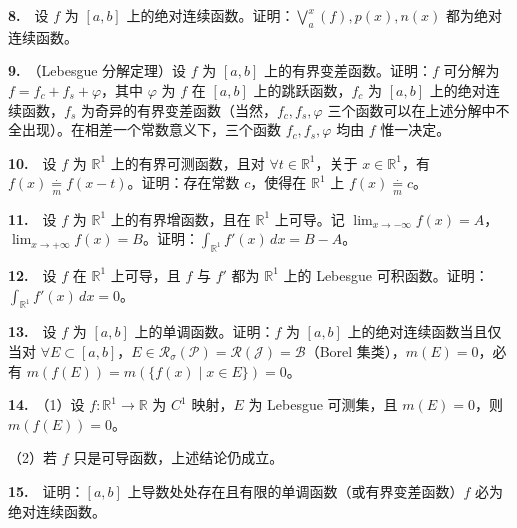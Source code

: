 \documentclass[11pt,a4paper]{article}
\begin{document}
\par{}\noindent \textbf{8.}　设 \(f\) 为 \([a,b]\) 上的绝对连续函数。证明：\(\bigvee_a^x(f),p(x),n(x)\) 都为绝对连续函数。

\par{}\noindent \textbf{9.}　（Lebesgue 分解定理）设 \(f\) 为 \([a,b]\) 上的有界变差函数。证明：\(f\) 可分解为 \(f=f_c+f_s+\varphi\)，其中 \(\varphi\) 为 \(f\) 在 \([a,b]\) 上的跳跃函数，\(f_c\) 为 \([a,b]\) 上的绝对连续函数，\(f_s\) 为奇异的有界变差函数（当然，\(f_c,f_s,\varphi\) 三个函数可以在上述分解中不全出现）。在相差一个常数意义下，三个函数 \(f_c,f_s,\varphi\) 均由 \(f\) 惟一决定。

\par{}\noindent \textbf{10.}　设 \(f\) 为 \(\mathbb R^1\) 上的有界可测函数，且对 \(\forall t\in\mathbb R^1\)，关于 \(x\in\mathbb R^1\)，有 \(f(x)\underset{m}{\overset{\cdot}{=}} f(x-t)\)。证明：存在常数 \(c\)，使得在 \(\mathbb R^1\) 上 \(f(x)\underset{m}{\overset{\cdot}{=}} c\)。

\par{}\noindent \textbf{11.}　设 \(f\) 为 \(\mathbb R^1\) 上的有界增函数，且在 \(\mathbb R^1\) 上可导。记 \(\lim_{x\to-\infty} f(x)=A\)，\(\lim_{x\to+\infty}f(x)=B\)。证明：\(\int_{\mathbb R^1}f'(x)\,dx=B-A\)。

\par{}\noindent \textbf{12.}　设 \(f\) 在 \(\mathbb R^1\) 上可导，且 \(f\) 与 \(f'\) 都为 \(\mathbb R^1\) 上的 Lebesgue 可积函数。证明：\(\int_{\mathbb R^1}f'(x)\,dx=0\)。

\par{}\noindent \textbf{13.}　设 \(f\) 为 \([a,b]\) 上的单调函数。证明：\(f\) 为 \([a,b]\) 上的绝对连续函数当且仅当对 \(\forall E\subset[a,b]\)，\(E\in\mathcal R_\sigma(\mathcal P)=\mathcal R(\mathcal J)=\mathcal B\)（Borel 集类），\(m(E)=0\)，必有 \(m(f(E))=m(\{f(x)\mid x\in E\})=0\)。

\par{}\noindent \textbf{14.}　（1）设 \(f:\mathbb R^1\to\mathbb R\) 为 \(C^1\) 映射，\(E\) 为 Lebesgue 可测集，且 \(m(E)=0\)，则 \(m(f(E))=0\)。

（2）若 \(f\) 只是可导函数，上述结论仍成立。

\par{}\noindent \textbf{15.}　证明：\([a,b]\) 上导数处处存在且有限的单调函数（或有界变差函数）\(f\) 必为绝对连续函数。
\end{document}
